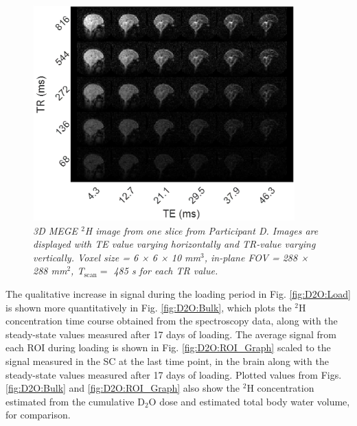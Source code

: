\begin{figure}[H]
    \centering
    \includegraphics[width = 0.9\textwidth]{Figures/D2O/TR_TE.png}
    \caption{\textit{3D MEGE $^2$H image from one slice from Participant D. Images are displayed with TE value varying horizontally and TR-value varying vertically. Voxel size = 6 × 6 × 10 mm$^3$, in-plane FOV = 288 × 288 mm$^2$, T$_\textrm{scan} =$ 485 s for each \ac{TR} value.}}
    \label{fig:D2O:TR_TE}
\end{figure}

The qualitative increase in signal during the loading period in Fig. \ref{fig:D2O:Load} is shown more quantitatively in Fig. \ref{fig:D2O:Bulk}, which plots the $^2$H concentration time course obtained from the spectroscopy data, along with the steady-state values measured after 17 days of loading. The average signal from each \ac{ROI} during loading is shown in Fig. \ref{fig:D2O:ROI_Graph} scaled to the signal measured in the \ac{SC} at the last time point, in the brain along with the steady-state values measured after 17 days of loading. Plotted values from Figs. \ref{fig:D2O:Bulk} and \ref{fig:D2O:ROI_Graph} also show the $^2$H concentration estimated from the cumulative D$_2$O dose and estimated total body water volume, for comparison. 

